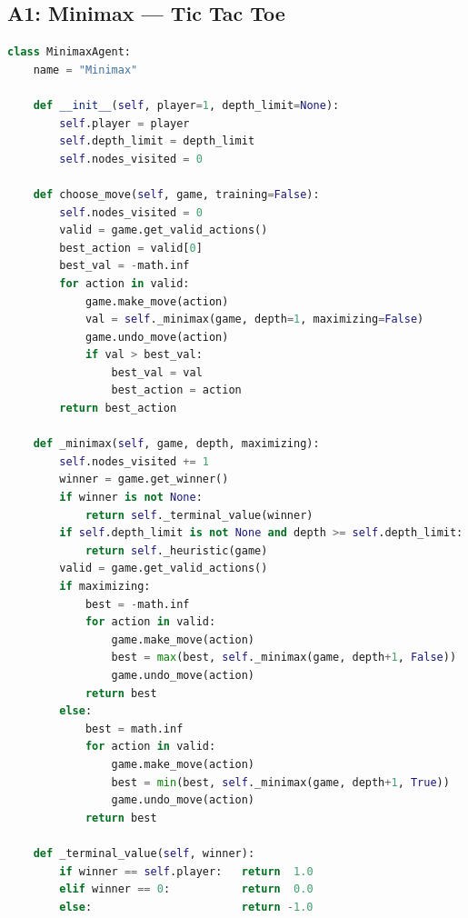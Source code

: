 \documentclass[12pt, a4paper]{article}
\begin{document}
\subsection{A1: Minimax --- Tic Tac Toe}
\begin{lstlisting}[language=Python, caption={Minimax (no pruning) applied to Tic Tac Toe.}]
class MinimaxAgent:
    name = "Minimax"

    def __init__(self, player=1, depth_limit=None):
        self.player = player
        self.depth_limit = depth_limit
        self.nodes_visited = 0

    def choose_move(self, game, training=False):
        self.nodes_visited = 0
        valid = game.get_valid_actions()
        best_action = valid[0]
        best_val = -math.inf
        for action in valid:
            game.make_move(action)
            val = self._minimax(game, depth=1, maximizing=False)
            game.undo_move(action)
            if val > best_val:
                best_val = val
                best_action = action
        return best_action

    def _minimax(self, game, depth, maximizing):
        self.nodes_visited += 1
        winner = game.get_winner()
        if winner is not None:
            return self._terminal_value(winner)
        if self.depth_limit is not None and depth >= self.depth_limit:
            return self._heuristic(game)
        valid = game.get_valid_actions()
        if maximizing:
            best = -math.inf
            for action in valid:
                game.make_move(action)
                best = max(best, self._minimax(game, depth+1, False))
                game.undo_move(action)
            return best
        else:
            best = math.inf
            for action in valid:
                game.make_move(action)
                best = min(best, self._minimax(game, depth+1, True))
                game.undo_move(action)
            return best

    def _terminal_value(self, winner):
        if winner == self.player:   return  1.0
        elif winner == 0:           return  0.0
        else:                       return -1.0
\end{lstlisting}
\end{document}
